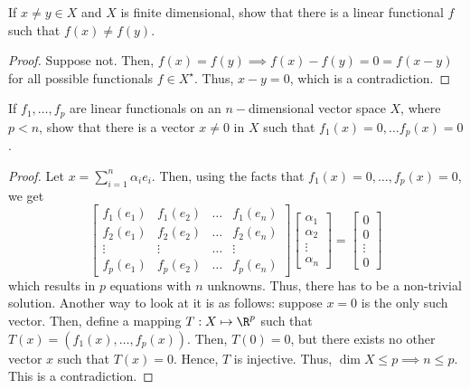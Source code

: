 \begin{question}
    If $x \neq y \in X$ and $X$ is finite dimensional, show that there is a linear functional $f$ such that $f(x) \neq f(y)$.
    \label{section2.9-11}
\end{question}
\begin{proof}
    Suppose not. Then, $f(x) = f(y) \implies f(x) - f(y) = 0 = f(x - y)$ for all possible functionals $f \in X^\star$. Thus, $x-y = 0$, which is a contradiction.
\end{proof}

\begin{question}
    If $f_1 , \ldots , f_p$ are linear functionals on an $n-$dimensional vector space $X$, where $p < n$, show that there is a vector $x \neq 0$ in $X$ such that $f_1(x) = 0 , \ldots f_p(x) = 0$.
    \label{section2.9-12}
\end{question}
\begin{proof}
    Let $x = \sum_{i=1}^n \alpha_i e_i$. Then, using the facts that $f_1(x) = 0 , \ldots , f_p(x) = 0$, we get
    \[\begin{bmatrix}
        f_1(e_1) & f_1(e_2) & \ldots & f_1(e_n)\\
        f_2(e_1) & f_2(e_2) & \ldots & f_2(e_n)\\
        \vdots & \vdots & \ldots & \vdots\\
        f_p(e_1) & f_p(e_2) & \ldots & f_p(e_n)
    \end{bmatrix}
    \begin{bmatrix}
        \alpha_1 \\ \alpha_2 \\\vdots \\\alpha_n
    \end{bmatrix} = 
    \begin{bmatrix}
        0 \\ 0 \\ \vdots \\ 0
    \end{bmatrix}\]
    which results in $p$ equations with $n$ unknowns. Thus, there has to be a non-trivial solution. Another way to look at it is as follows: suppose $x = 0$ is the only such vector. Then, define a mapping $T: X \mapsto \R^p$ such that $T(x) = (f_1(x) , \ldots ,f_p(x)).$ Then, $T(0) = 0$, but there exists no other vector $x$ such that $T(x) = 0$. Hence, $T$ is injective. Thus, $\dim X \leq p \implies n\leq p$. This is a contradiction.
\end{proof}

